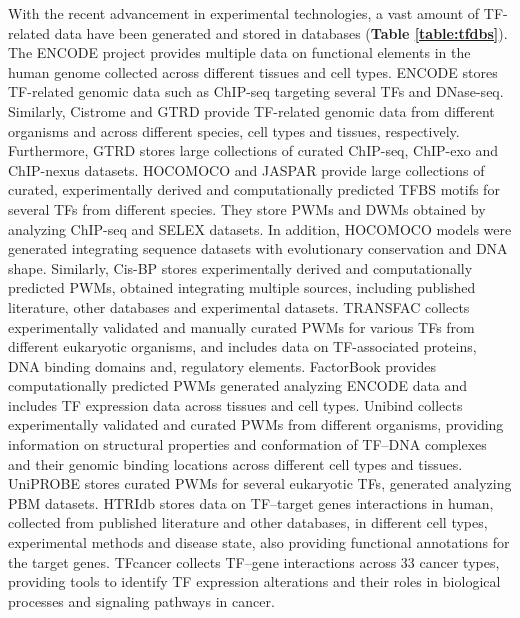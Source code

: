 \documentclass[a4paper, titlepage, openright]{book}
\begin{document}
With the recent advancement in experimental technologies, a vast amount of TF-related data have been generated and stored in databases (\textbf{Table \ref{table:tfdbs}}). The ENCODE project \citep{encode2012integrated} provides multiple data on functional elements in the human genome collected across different tissues and cell types. ENCODE stores TF-related genomic data such as ChIP-seq targeting several TFs and DNase-seq. Similarly, Cistrome \citep{zheng2019cistrome} and GTRD \citep{kolmykov2021gtrd} provide TF-related genomic data from different organisms and across different species, cell types and tissues, respectively. Furthermore, GTRD stores large collections of curated ChIP-seq, ChIP-exo and ChIP-nexus datasets. HOCOMOCO  \citep{kulakovskiy2013hocomoco, kulakovskiy2018hocomoco} and JASPAR  \citep{sandelin2004jaspar, fornes2020jaspar} provide large collections of curated, experimentally derived and computationally predicted TFBS motifs for several TFs from different species. They store PWMs and DWMs obtained by analyzing ChIP-seq and SELEX datasets. In addition, HOCOMOCO models were generated integrating sequence datasets with evolutionary conservation and DNA shape. Similarly, Cis-BP \citep{weirauch2014determination} stores experimentally derived and computationally predicted PWMs, obtained integrating multiple sources, including published literature, other databases and experimental datasets. TRANSFAC \citep{wingender1996transfac, wingender2000transfac} collects experimentally validated and manually curated PWMs for various TFs from different eukaryotic organisms, and includes data on TF-associated proteins, DNA binding domains and, regulatory elements. FactorBook \citep{pratt2022factorbook} provides computationally predicted PWMs generated analyzing ENCODE data and includes TF expression data across tissues and cell types. Unibind \citep{puig2021unibind} collects experimentally validated and curated PWMs from different organisms, providing information on structural properties and conformation of TF–DNA complexes and their genomic binding locations across different cell types and tissues. UniPROBE \citep{newburger2009uniprobe} stores curated PWMs for several eukaryotic TFs, generated analyzing PBM datasets. HTRIdb \citep{bovolenta2012htridb} stores data on TF–target genes interactions in human, collected from published literature and other databases, in different cell types, experimental methods and disease state, also providing functional annotations for the target genes. TFcancer \citep{huang2021tfcancer} collects TF–gene interactions across 33 cancer types, providing tools to identify TF expression alterations and their roles in biological processes and signaling pathways in cancer.
\end{document}
